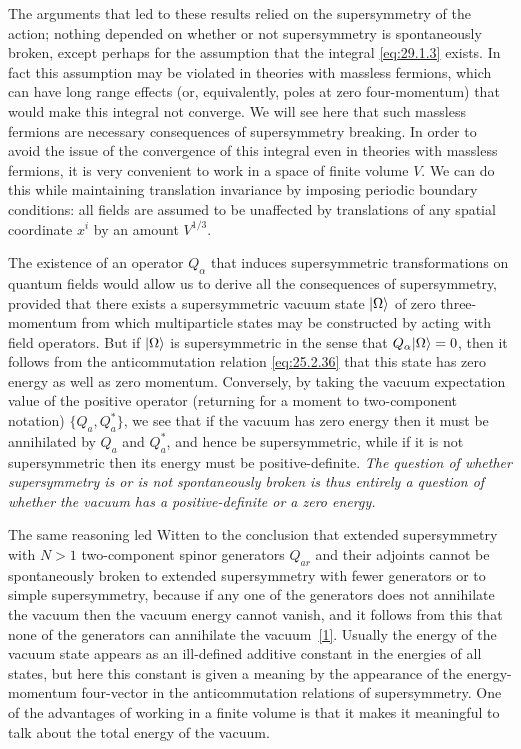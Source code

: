The arguments that led to these results relied on the supersymmetry of the
action; nothing depended on whether or not supersymmetry is spontaneously
broken, except perhaps for the assumption that the integral
\eqref{eq:29.1.3} exists. In fact this assumption may be violated in
theories with massless fermions, which can have long range effects (or,
equivalently, poles at zero four-momentum) that would make this integral
not converge. We will see here that such massless fermions are necessary
consequences of supersymmetry breaking. In order to avoid the issue of the
convergence of this integral even in theories with massless fermions, it is
very convenient to work in a space of finite volume \(V\). We can do this
while maintaining translation invariance by imposing periodic boundary
conditions: all fields are assumed to be unaffected by translations of any
spatial coordinate \(x^i\) by an amount \(V^{1/3}\).

The existence of an operator \(Q_\alpha\) that induces supersymmetric
transformations on quantum fields would allow us to derive all the
consequences of supersymmetry, provided that there exists a supersymmetric
vacuum state \(\lvert \Omega\rangle\) of zero three-momentum from which
multiparticle states may be constructed by acting with field operators.
But if \(\lvert \Omega\rangle\) is supersymmetric in the sense that
\(Q_\alpha\lvert \Omega\rangle=0\), then it follows from the anticommutation
relation \eqref{eq:25.2.36} that this state has zero energy as well as zero
momentum. Conversely, by taking the vacuum expectation value of the
positive operator (returning for a moment to two-component notation)
\(\{Q_a,Q_a^*\}\), we see that if the vacuum has zero energy then it must
be annihilated by \(Q_a\) and \(Q_a^*\), and hence be supersymmetric, while
if it is not supersymmetric then its energy must be positive-definite.
\emph{The question of whether supersymmetry is or is not spontaneously
broken is thus entirely a question of whether the vacuum has a
positive-definite or a zero energy.}

The same reasoning led Witten to the conclusion that extended
supersymmetry with \(N>1\) two-component spinor generators \(Q_{ar}\) and
their adjoints cannot be spontaneously broken to extended supersymmetry
with fewer generators or to simple supersymmetry, because if any one of
the generators does not annihilate the vacuum then the vacuum energy
cannot vanish, and it follows from this that none of the generators can
annihilate the vacuum~\hyperref[ch29-ref-1]{[1]}. Usually the energy of the
vacuum state appears as an ill-defined additive constant in the energies
of all states, but here this constant is given a meaning by the appearance
of the energy-momentum four-vector in the anticommutation relations of
supersymmetry. One of the advantages of working in a finite volume is that
it makes it meaningful to talk about the total energy of the vacuum.

